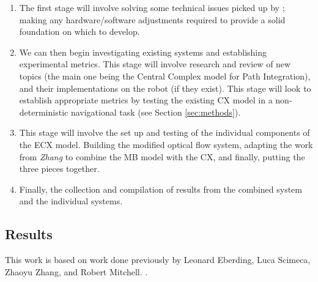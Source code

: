 \documentclass[a4paper,11pt,twoside,openright]{article}
\begin{document}
\begin{enumerate}
\item{The first stage will involve solving some technical issues
  picked up by \cite{Mitchell2018}; making any hardware/software adjustments
  required to provide a solid foundation on which to develop.}

\item{We can then begin investigating existing systems and establishing
  experimental metrics. This stage will involve research and review of new topics
  (the main one being the Central Complex model for Path Integration), and their
implementations on the robot (if they exist). This stage will look to establish
appropriate metrics by testing the existing CX model in a non-deterministic
navigational task (see Section \ref{sec:methods}).}

\item{This stage will involve the set up and testing of the individual components
  of the ECX model. Building the modified optical flow system, adapting the work
  from \textit{Zhang} to combine the MB model with the CX, and finally, putting
  the three pieces together.}

\item{Finally, the collection and compilation of results from the combined system
and the individual systems.}
\end{enumerate}


\subsection { Results }
This work is based on work done previously by Leonard Eberding, Luca Scimeca,
Zhaoyu Zhang, and Robert Mitchell.
\cite{Eberding2016, Scimeca2017, Zhang2017, Mitchell2018}.
\newline
\end{document}
